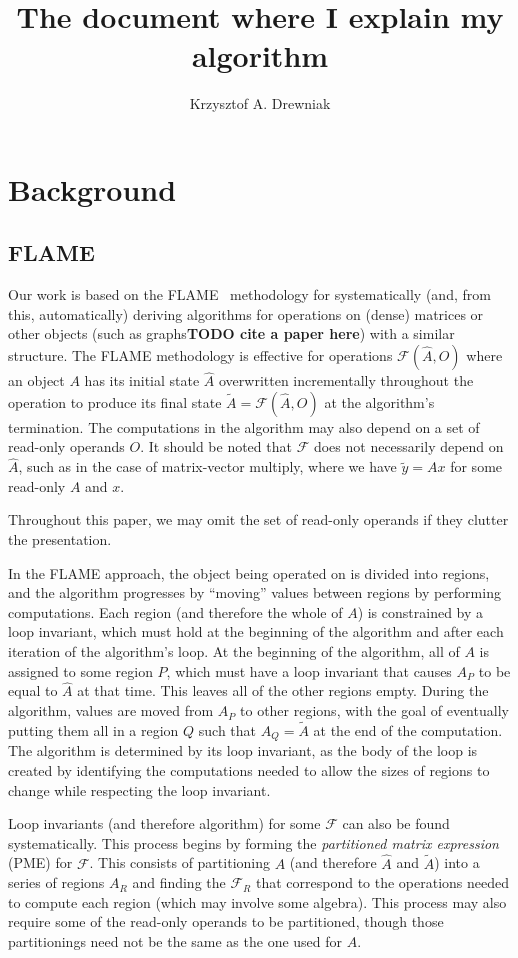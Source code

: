 \documentclass[12pt,letterpaper]{article}
\title{The document where I explain my algorithm}
\author{Krzysztof A. Drewniak}
\newcommand*{\mycite}[1]{~\cite{#1}}
\newcommand*{\opF}{\mathcal{F}}
\begin{document}
\maketitle{}
\section{Background}
\subsection{FLAME}
Our work is based on the FLAME\mycite{Bientinesi2005,Low2013} methodology for systematically (and, from this, automatically) deriving algorithms for operations on (dense) matrices or other objects (such as graphs\textbf{TODO cite a paper here}) with a similar structure.
The FLAME methodology is effective for operations $\opF(\hat{A}, O)$ where an object $A$ has its initial state $\hat{A}$ overwritten incrementally throughout the operation to produce its final state $\widetilde{A} = \opF(\hat{A}, O)$ at the algorithm's termination.
The computations in the algorithm may also depend on a set of read-only operands $O$.
It should be noted that $\opF$ does not necessarily depend on $\hat{A}$, such as in the case of matrix-vector multiply, where we have $\widetilde{y} = Ax$ for some read-only $A$ and $x$.

Throughout this paper, we may omit the set of read-only operands if they clutter the presentation.

In the FLAME approach, the object being operated on is divided into regions, and the algorithm progresses by ``moving'' values between regions by performing computations.
Each region (and therefore the whole of $A$) is constrained by a loop invariant, which must hold at the beginning of the algorithm and after each iteration of the algorithm's loop.
At the beginning of the algorithm, all of $A$ is assigned to some region $P$, which must have a loop invariant that causes $A_P$ to be equal to $\hat{A}$ at that time.
This leaves all of the other regions empty.
During the algorithm, values are moved from $A_P$ to other regions, with the goal of eventually putting them all in a region $Q$ such that $A_Q = \widetilde{A}$ at the end of the computation.
The algorithm is determined by its loop invariant, as the body of the loop is created by identifying the computations needed to allow the sizes of regions to change while respecting the loop invariant.

Loop invariants (and therefore algorithm) for some $\opF$ can also be found systematically.
This process begins by forming the \emph{partitioned matrix expression} (PME) for $\opF$.
This consists of partitioning $A$ (and therefore $\hat{A}$ and $\widetilde{A}$) into a series of regions $A_R$ and finding the $\opF_R$ that correspond to the operations needed to compute each region (which may involve some algebra).
This process may also require some of the read-only operands to be partitioned, though those partitionings need not be the same as the one used for $A$.
\end{document}
